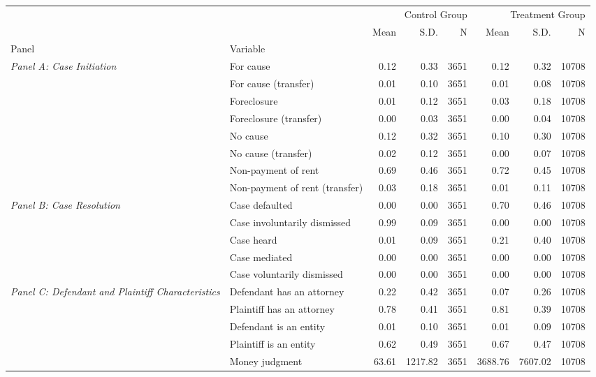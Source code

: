 \begin{table}[H]
\begin{tabular}{llrrrrrr}
\toprule
 &  & \multicolumn{3}{r}{Control Group} & \multicolumn{3}{r}{Treatment Group} \\
 &  & Mean & S.D. & N & Mean & S.D. & N \\
Panel & Variable &  &  &  &  &  &  \\
\midrule
\multirow[c]{8}{3cm}{\textit{Panel A: Case Initiation}} & For cause & 0.12 & 0.33 & 3651 & 0.12 & 0.32 & 10708 \\
 & For cause (transfer) & 0.01 & 0.10 & 3651 & 0.01 & 0.08 & 10708 \\
 & Foreclosure & 0.01 & 0.12 & 3651 & 0.03 & 0.18 & 10708 \\
 & Foreclosure (transfer) & 0.00 & 0.03 & 3651 & 0.00 & 0.04 & 10708 \\
 & No cause & 0.12 & 0.32 & 3651 & 0.10 & 0.30 & 10708 \\
 & No cause (transfer) & 0.02 & 0.12 & 3651 & 0.00 & 0.07 & 10708 \\
 & Non-payment of rent & 0.69 & 0.46 & 3651 & 0.72 & 0.45 & 10708 \\
 & Non-payment of rent (transfer) & 0.03 & 0.18 & 3651 & 0.01 & 0.11 & 10708 \\
\cline{1-8}
\multirow[c]{5}{3cm}{\textit{Panel B: Case Resolution}} & Case defaulted & 0.00 & 0.00 & 3651 & 0.70 & 0.46 & 10708 \\
 & Case involuntarily dismissed & 0.99 & 0.09 & 3651 & 0.00 & 0.00 & 10708 \\
 & Case heard & 0.01 & 0.09 & 3651 & 0.21 & 0.40 & 10708 \\
 & Case mediated & 0.00 & 0.00 & 3651 & 0.00 & 0.00 & 10708 \\
 & Case voluntarily dismissed & 0.00 & 0.00 & 3651 & 0.00 & 0.00 & 10708 \\
\cline{1-8}
\multirow[c]{5}{3cm}{\textit{Panel C: Defendant and Plaintiff Characteristics}} & Defendant has an attorney & 0.22 & 0.42 & 3651 & 0.07 & 0.26 & 10708 \\
 & Plaintiff has an attorney & 0.78 & 0.41 & 3651 & 0.81 & 0.39 & 10708 \\
 & Defendant is an entity & 0.01 & 0.10 & 3651 & 0.01 & 0.09 & 10708 \\
 & Plaintiff is an entity & 0.62 & 0.49 & 3651 & 0.67 & 0.47 & 10708 \\
 & Money judgment & 63.61 & 1217.82 & 3651 & 3688.76 & 7607.02 & 10708 \\

\end{tabular}
\end{table}
